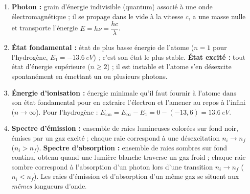 \documentclass[11pt]{article}
\begin{document}
\begin{corrige}
\begin{enumerate}
\item \textbf{Photon :} grain d'énergie indivisible (quantum) associé à une onde électromagnétique ; il se propage dans le vide à la vitesse $c$, a une masse nulle et transporte l'énergie $E = h\nu = \dfrac{hc}{\lambda}$.
\item \textbf{État fondamental :} état de plus basse énergie de l'atome ($n = 1$ pour l'hydrogène, $E_1 = -\SI{13,6}{eV}$) ; c'est son état le plus stable. \textbf{État excité :} tout état d'énergie supérieure ($n \geq 2$) ; il est instable et l'atome s'en désexcite spontanément en émettant un ou plusieurs photons.
\item \textbf{Énergie d'ionisation :} énergie minimale qu'il faut fournir à l'atome dans son état fondamental pour en extraire l'électron et l'amener au repos à l'infini ($n \to \infty$). Pour l'hydrogène : $E_{\text{ion}} = E_\infty - E_1 = 0 - (-13,6) = \SI{13,6}{eV}$.
\item \textbf{Spectre d'émission :} ensemble de raies lumineuses colorées sur fond noir, émises par un gaz excité ; chaque raie correspond à une désexcitation $n_i \to n_f$ ($n_i > n_f$). \textbf{Spectre d'absorption :} ensemble de raies sombres sur fond continu, obtenu quand une lumière blanche traverse un gaz froid ; chaque raie sombre correspond à l'absorption d'un photon lors d'une transition $n_i \to n_f$ ($n_i < n_f$). Les raies d'émission et d'absorption d'un même gaz se situent aux \emph{mêmes} longueurs d'onde.
\end{enumerate}
\end{corrige}
\end{document}
